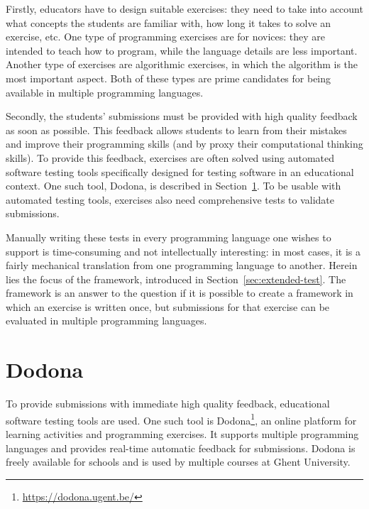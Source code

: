 \documentclass[5p,number]{elsarticle}
\begin{document}
    Firstly, educators have to design suitable exercises: they need to take into account what concepts the students are familiar with, how long it takes to solve an exercise, etc.
    One type of programming exercises are for novices: they are intended to teach how to program, while the language details are less important.
    Another type of exercises are algorithmic exercises, in which the algorithm is the most important aspect.
    Both of these types are prime candidates for being available in multiple programming languages.
    
    Secondly, the students' submissions must be provided with high quality feedback as soon as possible.
    This feedback allows students to learn from their mistakes and improve their programming skills (and by proxy their computational thinking skills).
    To provide this feedback, exercises are often solved using automated software testing tools specifically designed for testing software in an educational context.
    One such tool, Dodona, is described in Section~\ref{sec:extended-dodona}.
    To be usable with automated testing tools, exercises also need comprehensive tests to validate submissions.
    
    Manually writing these tests in every programming language one wishes to support is time-consuming and not intellectually interesting: in most cases, it is a fairly mechanical translation from one programming language to another.
    Herein lies the focus of the \tested{} framework, introduced in Section~\ref{sec:extended-test}.
    The framework is an answer to the question if it is possible to create a framework in which an exercise is written once, but submissions for that exercise can be evaluated in multiple programming languages.

    \section{Dodona}\label{sec:extended-dodona}
    
    To provide submissions with immediate high quality feedback, educational software testing tools are used.
    One such tool is Dodona\footnote{\url{https://dodona.ugent.be/}}, an online platform for learning activities and programming exercises.
    It supports multiple programming languages and provides real-time automatic feedback for submissions.
    Dodona is freely available for schools and is used by multiple courses at Ghent University.
\end{document}
